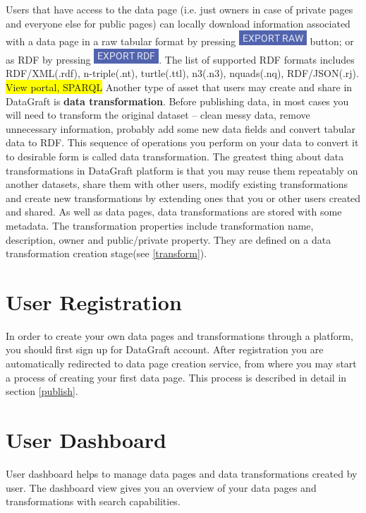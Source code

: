 \documentclass[USenglish]{article}
\begin{document}
Users that have access to the data page (i.e. just owners in case of private pages and everyone else for public pages) can locally download information associated with a data page in a raw tabular format by pressing {\includegraphics[scale=0.8]{exportraw.png}} button; or as RDF by pressing {\includegraphics[scale=0.8]{exportrdf.png}}. The list of supported RDF formats includes RDF/XML(.rdf), n-triple(.nt), turtle(.ttl), n3(.n3), nquads(.nq), RDF/JSON(.rj).
  \colorbox{yellow}{View portal, SPARQL} 
\newline
\newline
Another type of asset that users may create and share in DataGraft is \textbf{data transformation}. Before publishing data, in most cases you will need to transform the original dataset -- clean messy data, remove unnecessary information, probably add some new data fields and convert tabular data to RDF. This sequence of operations you perform on your data to convert it to desirable form is called data transformation. The greatest thing about data transformations in DataGraft platform is that you may reuse them repeatably on another datasets, share them with other users, modify existing transformations and create new transformations by extending ones that you or other users created and shared.
As well as data pages, data transformations are stored with some metadata. The transformation properties include transformation name, description, owner and public/private property. They are defined on a data transformation creation stage(see \ref{transform}).
\section{User Registration}
In order to create your own data pages and transformations through a platform, you should first sign up for DataGraft account. After registration you are automatically redirected to data page creation service, from where you may start a process of creating your first data page. This process is described in detail in section \ref{publish}.

\section{User Dashboard}
User dashboard helps to manage data pages and data transformations created by user.  The dashboard view gives you an overview of your data pages and transformations with search capabilities. 
\end{document}
